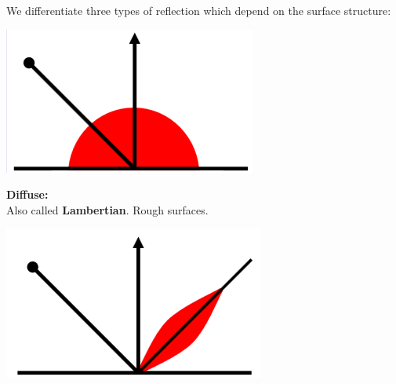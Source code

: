 \documentclass[a4paper, fontsize=8pt, landscape, DIV=1]{scrartcl}
\begin{document}
\begin{multicols*}{4}
		We differentiate three types of reflection which depend on the surface structure: 
		\begin{minipage}[t]{0.49\columnwidth}
			\begin{flushleft}
				\includegraphics[width=\columnwidth]{images/Introduction/refl_diffuse.png}\\
			\end{flushleft}
		\end{minipage}
		\begin{minipage}[b]{0.49\columnwidth}
			\begin{flushleft}
				\textbf{Diffuse:}\\
				Also called \textbf{Lambertian}. Rough surfaces.
				\vspace{0.2cm}
			\end{flushleft}
		\end{minipage}
		\par
		\begin{minipage}[t]{0.49\columnwidth}
			\begin{flushleft}
				\includegraphics[width=\columnwidth]{images/Introduction/refl_mirror.png}\\

\end{flushleft}
\end{minipage}
\end{multicols*}
\end{document}
